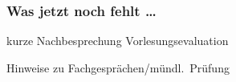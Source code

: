 \begin{frame}
  \frametitle{Was jetzt noch fehlt \dots}

  \begin{Itemize}
    \item
      kurze Nachbesprechung Vorlesungsevaluation
    \item
      Hinweise zu Fachgesprächen/mündl.\ Prüfung
  \end{Itemize}


  \par\bigskip
  \note{~}
\end{frame}

%
